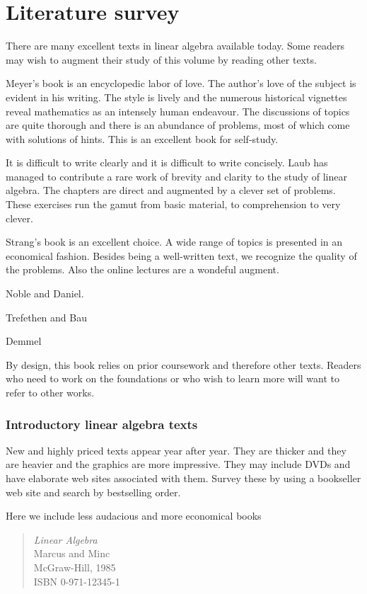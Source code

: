\chapter*{Literature survey}

There are many excellent texts in linear algebra available today. Some readers may wish to augment their study of this volume by reading other texts.

Meyer's book is an encyclopedic labor of love. The author's love of the subject is evident in his writing. The style is lively and the numerous historical vignettes reveal mathematics as an intensely human endeavour. The discussions of topics are quite thorough and there is an abundance of problems, most of which come with solutions of hints. This is an excellent book for self-study.

It is difficult to write clearly and it is difficult to write concisely. Laub has managed to contribute a rare work of brevity and clarity to the study of linear algebra. The chapters are direct and augmented by a clever set of problems. These exercises run the gamut from basic material, to comprehension to very clever.

Strang's book is an excellent choice. A wide range of topics is presented in an economical fashion. Besides being a well-written text, we recognize the quality of the problems. Also the online lectures are a wondeful augment.

Noble and Daniel. 

Trefethen and Bau

Demmel

By design, this book relies on prior coursework and therefore other texts. Readers who need to work on the foundations or who wish to learn more will want to refer to other works.

\subsection*{Introductory linear algebra texts}
New and highly priced texts appear year after year. They are thicker and they are heavier and the graphics are more impressive. They may include DVDs and have elaborate web sites associated with them. Survey these by using a bookseller web site and search by bestselling order.

Here we include less audacious and more economical books
\begin{quote}
\textit{Linear Algebra}\\
Marcus and Minc\\
McGraw-Hill, 1985\\
ISBN 0-971-12345-1
\end{quote}


